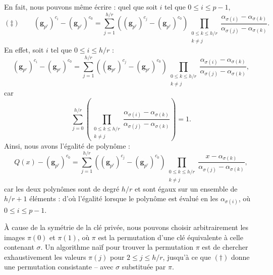 \documentclass[a4paper, titlepage, 11pt]{article}
\theoremstyle{definition}
\theoremstyle{remark}
\def\mbf#1{\mathbf{#1}}
\begin{document}
En fait, nous pouvons même écrire : quel que soit $i$ tel que $0\leqslant i \leqslant p-1$,
$$(\ddagger) \qquad (\mbf g_{p^r})^{c_i} - (\mbf g_{p^r})^{c_{0}} = \sum_{j=1}^{h/r} \left((\mbf g_{p^r})^{c_{j}} - (\mbf g_{p^r})^{c_{0}} \right)\prod_{\substack{0\leqslant k\leqslant h/r \\ k \neq j}} \frac{\alpha_{\sigma(i)}-\alpha_{\sigma(k)}}{\alpha_{\sigma(j)}-\alpha_{\sigma(k)}}.$$
En effet, soit $i$ tel que $0 \leqslant i \leqslant {h/r}$ :
$$(\mbf g_{p^r})^{c_i} - (\mbf g_{p^r})^{c_{0}} = \sum_{j=1}^{h/r} \left((\mbf g_{p^r})^{c_{j}} - (\mbf g_{p^r})^{c_{0}} \right)\prod_{\substack{0\leqslant k\leqslant h/r \\ k \neq j}} \frac{\alpha_{\sigma(i)}-\alpha_{\sigma(k)}}{\alpha_{\sigma(j)}-\alpha_{\sigma(k)}},$$
car $$\sum_{j=0}^{h/r} \left(\prod_{\substack{0\leqslant k\leqslant h/r \\ k \neq j}} \frac{\alpha_{\sigma(i)}-\alpha_{\sigma(k)}}{\alpha_{\sigma(j)}-\alpha_{\sigma(k)}}\right) = 1.$$
Ainsi, nous avons l'égalité de polynôme :
$$Q(x) - (\mbf g_{p^r})^{c_{0}} = \sum_{j=1}^{h/r} \left((\mbf g_{p^r})^{c_{j}} - (\mbf g_{p^r})^{c_{0}} \right)\prod_{\substack{0\leqslant k\leqslant h/r \\ k \neq j}} \frac{x-\alpha_{\sigma(k)}}{\alpha_{\sigma(j)}-\alpha_{\sigma(k)}},$$
car les deux polynômes sont de degré $h/r$ et sont égaux sur un ensemble de $h/r + 1$ éléments : d'où l'égalité lorsque le polynôme est évalué en les $\alpha_{\sigma(i)}$, où $0\leqslant i \leqslant p-1$.

\`A cause de la symétrie de la clé privée, nous pouvons choisir arbitrairement les images $\pi(0)$ et $\pi(1)$, où $\pi$ est la permutation d'une clé équivalente à celle contenant $\sigma$. Un algorithme naïf pour trouver la permutation $\pi$ est de chercher exhaustivement les valeurs $\pi(j)$ pour $2\leqslant j \leqslant h/r$, jusqu'à ce que $(\dagger)$ donne une permutation consistante -- avec $\sigma$ substituée par $\pi$.
\end{document}
